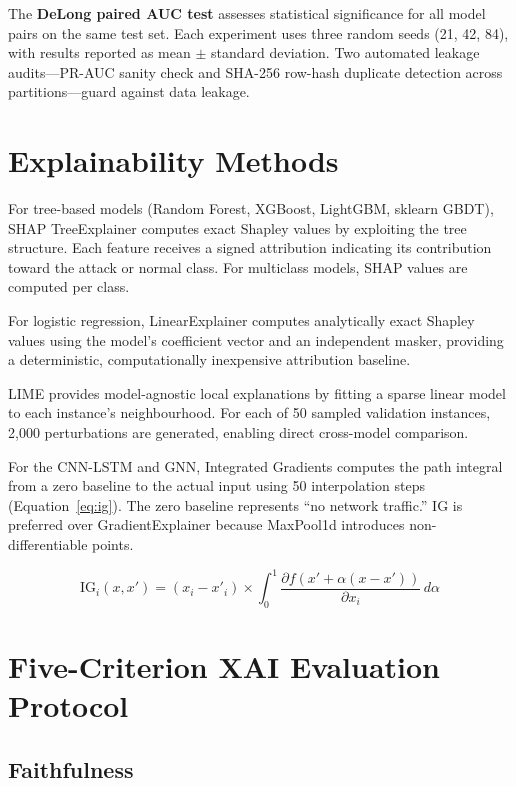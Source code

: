\documentclass[12pt,a4paper]{report}
\begin{document}
The \textbf{DeLong paired AUC test} \cite{deyoung2020} assesses statistical significance for all model pairs on the same test set. Each experiment uses three random seeds (21, 42, 84), with results reported as mean $\pm$ standard deviation. Two automated leakage audits---PR-AUC sanity check and SHA-256 row-hash duplicate detection across partitions---guard against data leakage.

\section{Explainability Methods}
\label{sec:xai-methods}

For tree-based models (Random Forest, XGBoost, LightGBM, sklearn GBDT), SHAP TreeExplainer \cite{lundberg2020} computes exact Shapley values by exploiting the tree structure. Each feature receives a signed attribution indicating its contribution toward the attack or normal class. For multiclass models, SHAP values are computed per class.

For logistic regression, LinearExplainer computes analytically exact Shapley values using the model's coefficient vector and an independent masker, providing a deterministic, computationally inexpensive attribution baseline.

LIME \cite{ribeiro2016} provides model-agnostic local explanations by fitting a sparse linear model to each instance's neighbourhood. For each of 50 sampled validation instances, 2,000 perturbations are generated, enabling direct cross-model comparison.

For the CNN-LSTM and GNN, Integrated Gradients \cite{sundararajan2017} computes the path integral from a zero baseline to the actual input using 50 interpolation steps (Equation~\ref{eq:ig}). The zero baseline represents ``no network traffic.'' IG is preferred over GradientExplainer because MaxPool1d introduces non-differentiable points.

\begin{equation}
\label{eq:ig}
\text{IG}_i(x, x') = (x_i - x'_i) \times \int_0^1 \frac{\partial f(x' + \alpha(x - x'))}{\partial x_i} \, d\alpha
\end{equation}

\section{Five-Criterion XAI Evaluation Protocol}
\label{sec:five-criterion}

\subsection{Faithfulness}
\label{sec:faithfulness}
\end{document}
